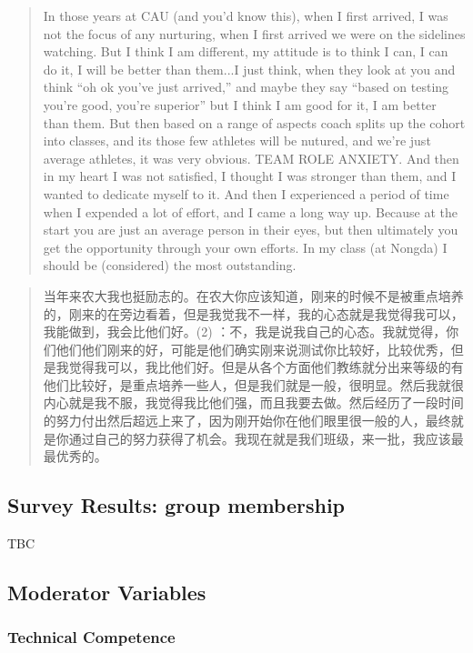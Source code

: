 \begin{CJK}{UTF8}{gbsn}
\begin{quotation}
    In those years at CAU (and you’d know this), when I first arrived, I was not the focus of any nurturing, when I first arrived we were on the sidelines watching.  But I think I am different, my attitude is to think I can, I can do it, I will be better than them...I just think, when they look at you and think ``oh ok you’ve just arrived,'' and maybe they say “based on testing you’re good, you’re superior” but I think I am good for it, I am better than them.  But then based on a range of aspects coach splits up the cohort into classes, and its those few athletes will be nutured, and we’re just average athletes, it was very obvious. TEAM ROLE ANXIETY. And then in my heart I was not satisfied, I thought I was stronger than them, and I wanted to dedicate myself to it.  And then I experienced a period of time when I expended a lot of effort, and I came a long way up.  Because at the start you are just an average person in their eyes, but then ultimately you get the opportunity through your own efforts. In my class (at Nongda) I should be (considered) the most outstanding.
\end{quotation}

    \begin{quotation}
    当年来农大我也挺励志的。在农大你应该知道，刚来的时候不是被重点培养的，刚来的在旁边看着，但是我觉我不一样，我的心态就是我觉得我可以，我能做到，我会比他们好。(2) ：不，我是说我自己的心态。我就觉得，你们他们他们刚来的好，可能是他们确实刚来说测试你比较好，比较优秀，但是我觉得我可以，我比他们好。但是从各个方面他们教练就分出来等级的有他们比较好，是重点培养一些人，但是我们就是一般，很明显。然后我就很内心就是我不服，我觉得我比他们强，而且我要去做。然后经历了一段时间的努力付出然后超远上来了，因为刚开始你在他们眼里很一般的人，最终就是你通过自己的努力获得了机会。我现在就是我们班级，来一批，我应该最最优秀的。
    \end{quotation}

\clearpage
\subsection{Survey Results: group membership}
TBC

\clearpage
\subsection{Moderator Variables}

        \subsubsection{Technical Competence}


\end{CJK}
